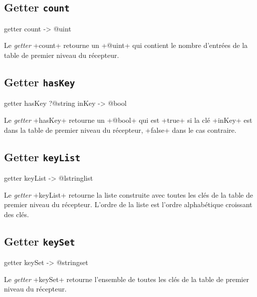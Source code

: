 \subsection{Getter \texttt{count}}

\begin{galgas}
getter count -> @uint
\end{galgas}


Le \emph{getter} \ggs+count+ retourne un \ggs+@uint+ qui contient le nombre d'entrées de la table de premier niveau du récepteur.



\subsection{Getter \texttt{hasKey}}

\begin{galgas}
getter hasKey ?@string inKey -> @bool
\end{galgas}


Le \emph{getter} \ggs+hasKey+ retourne un \ggs+@bool+ qui est \ggs+true+ si la clé \ggs+inKey+ est dans la table de premier niveau du récepteur, \ggs+false+ dans le cas contraire.



\subsection{Getter \texttt{keyList}}

\begin{galgas}
getter keyList -> @lstringlist
\end{galgas}


Le \emph{getter} \ggs+keyList+ retourne la liste construite avec toutes les clés de la table de premier niveau du récepteur. L'ordre de la liste est l'ordre alphabétique croissant des clés.



\subsection{Getter \texttt{keySet}}

\begin{galgas}
getter keySet -> @stringset
\end{galgas}


Le \emph{getter} \ggs+keySet+ retourne l'ensemble de toutes les clés de la table de premier niveau du récepteur.






